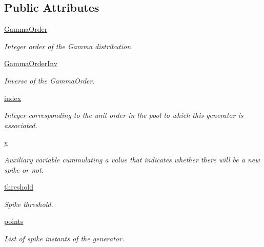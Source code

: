 \subsection*{Public Attributes}
\begin{DoxyCompactItemize}
\item 
\hyperlink{class_point_process_generator_1_1_point_process_generator_aa6c6513cd7f00dbdceb5f945a07cffee}{Gamma\+Order}
\begin{DoxyCompactList}\small\item\em Integer order of the Gamma distribution. \end{DoxyCompactList}\item 
\hyperlink{class_point_process_generator_1_1_point_process_generator_aa70be756b1535ff4512affa05a732fda}{Gamma\+Order\+Inv}
\begin{DoxyCompactList}\small\item\em Inverse of the Gamma\+Order. \end{DoxyCompactList}\item 
\hyperlink{class_point_process_generator_1_1_point_process_generator_a57f6c8af8fd3d37ed8ab2f4abe9be5d8}{index}
\begin{DoxyCompactList}\small\item\em Integer corresponding to the unit order in the pool to which this generator is associated. \end{DoxyCompactList}\item 
\hyperlink{class_point_process_generator_1_1_point_process_generator_a70a43b5c26daf20833ecbc9f4d979726}{y}
\begin{DoxyCompactList}\small\item\em Auxiliary variable cummulating a value that indicates whether there will be a new spike or not. \end{DoxyCompactList}\item 
\hyperlink{class_point_process_generator_1_1_point_process_generator_abcb23e09b752b797a1f11f2679373ca1}{threshold}
\begin{DoxyCompactList}\small\item\em Spike threshold. \end{DoxyCompactList}\item 
\hyperlink{class_point_process_generator_1_1_point_process_generator_ab36d31f34c0330e13ae9732d53984bab}{points}
\begin{DoxyCompactList}\small\item\em List of spike instants of the generator. \end{DoxyCompactList}\end{DoxyCompactItemize}


